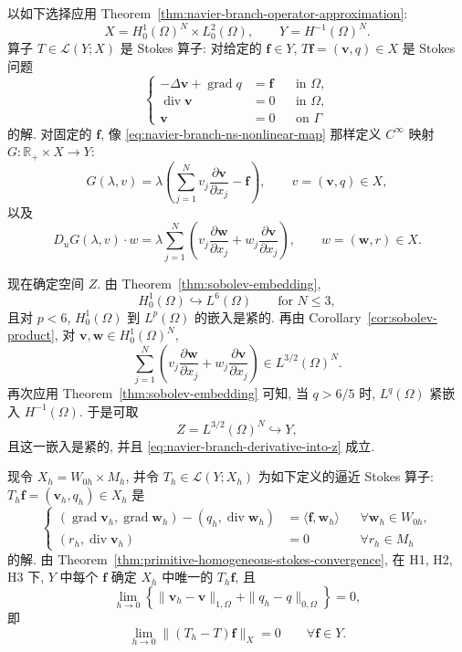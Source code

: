 \begin{Proof}
以如下选择应用 Theorem~\ref{thm:navier-branch-operator-approximation}:
\[
X=H_0^1(\Omega)^N\times L_0^2(\Omega),
\qquad Y=H^{-1}(\Omega)^N.
\]
算子 $T\in\mathcal L(Y;X)$ 是 Stokes 算子: 对给定的
$\boldsymbol f\in Y$, $T\boldsymbol f=(\boldsymbol v,q)\in X$ 是 Stokes 问题
\begin{equation}\label{eq:navier-centered-stokes-operator}
\left\{
\begin{aligned}
-\Delta\boldsymbol v+\operatorname{grad}q&=\boldsymbol f
&&\text{in }\Omega,\\
\operatorname{div}\boldsymbol v&=0
&&\text{in }\Omega,\\
\boldsymbol v&=0
&&\text{on }\Gamma
\end{aligned}
\right.
\end{equation}
的解. 对固定的 $\boldsymbol f$, 像 \eqref{eq:navier-branch-ns-nonlinear-map}
那样定义 $C^\infty$ 映射 $G:\mathbb R_+\times X\to Y$:
\[
G(\lambda,v)=
\lambda\left(\sum_{j=1}^{N}v_j
\frac{\partial\boldsymbol v}{\partial x_j}-\boldsymbol f\right),
\qquad v=(\boldsymbol v,q)\in X,
\]
以及
\[
D_uG(\lambda,v)\cdot w
=\lambda\sum_{j=1}^{N}\left(
v_j\frac{\partial\boldsymbol w}{\partial x_j}
+w_j\frac{\partial\boldsymbol v}{\partial x_j}\right),
\qquad w=(\boldsymbol w,r)\in X.
\]

现在确定空间 $Z$. 由 Theorem~\ref{thm:sobolev-embedding},
\[
H_0^1(\Omega)\hookrightarrow L^6(\Omega)
\qquad\text{for }N\leq3,
\]
且对 $p<6$, $H_0^1(\Omega)$ 到 $L^p(\Omega)$ 的嵌入是紧的.
再由 Corollary~\ref{cor:sobolev-product}, 对
$\boldsymbol v,\boldsymbol w\in H_0^1(\Omega)^N$,
\[
\sum_{j=1}^{N}\left(
v_j\frac{\partial\boldsymbol w}{\partial x_j}
+w_j\frac{\partial\boldsymbol v}{\partial x_j}\right)
\in L^{3/2}(\Omega)^N.
\]
再次应用 Theorem~\ref{thm:sobolev-embedding} 可知, 当 $q>6/5$ 时,
$L^q(\Omega)$ 紧嵌入 $H^{-1}(\Omega)$. 于是可取
\[
Z=L^{3/2}(\Omega)^N\hookrightarrow Y,
\]
且这一嵌入是紧的, 并且 \eqref{eq:navier-branch-derivative-into-z} 成立.

现令 $X_h=W_{0h}\times M_h$, 并令
$T_h\in\mathcal L(Y;X_h)$ 为如下定义的逼近 Stokes 算子:
$T_h\boldsymbol f=(\boldsymbol v_h,q_h)\in X_h$ 是
\[
\left\{
\begin{aligned}
(\operatorname{grad}\boldsymbol v_h,\operatorname{grad}\boldsymbol w_h)
-(q_h,\operatorname{div}\boldsymbol w_h)
&=\langle\boldsymbol f,\boldsymbol w_h\rangle
&&\forall\boldsymbol w_h\in W_{0h},\\
(r_h,\operatorname{div}\boldsymbol v_h)&=0
&&\forall r_h\in M_h
\end{aligned}
\right.
\]
的解. 由 Theorem~\ref{thm:primitive-homogeneous-stokes-convergence}, 在 H1, H2,
H3 下, $Y$ 中每个 $\boldsymbol f$ 确定 $X_h$ 中唯一的 $T_h\boldsymbol f$, 且
\begin{equation}\label{eq:navier-centered-stokes-operator-convergence}
\lim_{h\to0}
\left\{
\|\boldsymbol v_h-\boldsymbol v\|_{1,\Omega}
+\|q_h-q\|_{0,\Omega}
\right\}=0,
\end{equation}
即
\[
\lim_{h\to0}\|(T_h-T)\boldsymbol f\|_X=0
\qquad\forall\boldsymbol f\in Y.
\]


\end{Proof}
